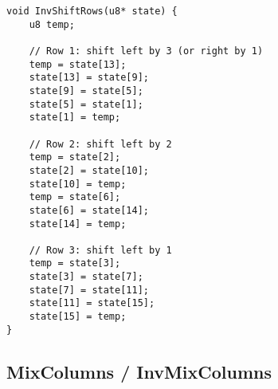 \newpage
\begin{lstlisting}[style=C, caption={ShiftRows},captionpos=t]
void InvShiftRows(u8* state) {
	u8 temp;
	
	// Row 1: shift left by 3 (or right by 1)
	temp = state[13];
	state[13] = state[9];
	state[9] = state[5];
	state[5] = state[1];
	state[1] = temp;
	
	// Row 2: shift left by 2
	temp = state[2];
	state[2] = state[10];
	state[10] = temp;
	temp = state[6];
	state[6] = state[14];
	state[14] = temp;
	
	// Row 3: shift left by 1
	temp = state[3];
	state[3] = state[7];
	state[7] = state[11];
	state[11] = state[15];
	state[15] = temp;
}
\end{lstlisting}

\newpage
\subsection{MixColumns / InvMixColumns}
